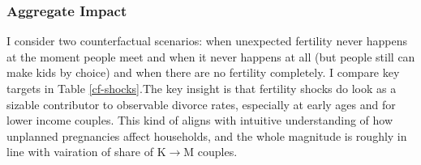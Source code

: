 \documentclass[12pt,letter]{article}
\begin{document}
\subsubsection{Aggregate Impact}
I consider two counterfactual scenarios: when unexpected fertility never happens at the moment people meet and when it never happens at all (but people still can make kids by choice) and when there are no fertility completely. I compare key targets in Table \ref{cf-shocks}.The key insight is that fertility shocks do look as a sizable contributor to observable divorce rates, especially at early ages and for lower income couples. This kind of aligns with intuitive understanding of how unplanned pregnancies affect households, and the whole magnitude is roughly in line with vairation of share of K$\to$M couples. 

\end{document}
